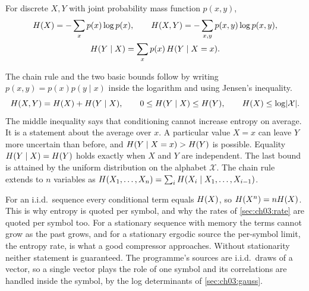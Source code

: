 \begin{definition}\label{def:ch03:entropy}
For discrete $X,Y$ with joint probability mass function $p(x,y)$,
\begin{equation}\label{eq:ch03:entropy}
\begin{gathered}
H(X)=-\sum_x p(x)\log p(x),\qquad
H(X,Y)=-\sum_{x,y}p(x,y)\log p(x,y),\\
H(Y\mid X)=\sum_x p(x)\,H(Y\mid X=x).
\end{gathered}
\end{equation}
\end{definition}

The chain rule and the two basic bounds follow by writing $p(x,y)=p(x)p(y\mid x)$ inside the logarithm and using Jensen's inequality.
\begin{equation}\label{eq:ch03:chain}
H(X,Y)=H(X)+H(Y\mid X),\qquad
0\le H(Y\mid X)\le H(Y),\qquad
H(X)\le\log\lvert \mathcal X\rvert.
\end{equation}
The middle inequality says that conditioning cannot increase entropy on average. It is a statement about the average over $x$. A particular value $X=x$ can leave $Y$ more uncertain than before, and $H(Y\mid X=x)>H(Y)$ is possible. Equality $H(Y\mid X)=H(Y)$ holds exactly when $X$ and $Y$ are independent. The last bound is attained by the uniform distribution on the alphabet $\mathcal X$. The chain rule extends to $n$ variables as $H(X_1,\dots,X_n)=\sum_i H(X_i\mid X_1,\dots,X_{i-1})$.

For an i.i.d.\ sequence every conditional term equals $H(X)$, so $H(X^n)=nH(X)$. This is why entropy is quoted per symbol, and why the rates of \cref{sec:ch03:rate} are quoted per symbol too. For a stationary sequence with memory the terms cannot grow as the past grows, and for a stationary ergodic source the per-symbol limit, the entropy rate, is what a good compressor approaches. Without stationarity neither statement is guaranteed. The programme's sources are i.i.d.\ draws of a vector, so a single vector plays the role of one symbol and its correlations are handled inside the symbol, by the log determinants of \cref{sec:ch03:gauss}.


